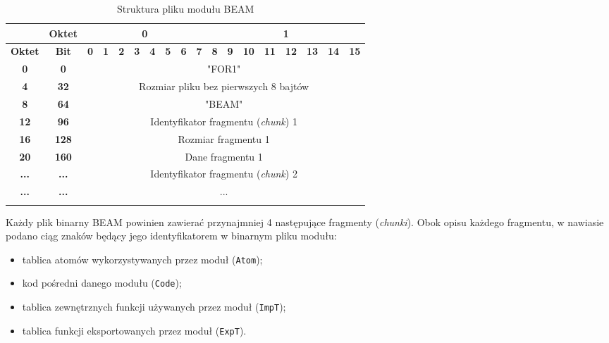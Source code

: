 \begin{longtable}{|c|c|c|c|c|c|c|c|c|c|c|c|c|c|c|c|c|c|}
\hline
         & \textbf{Oktet} & \multicolumn{8}{|c|}{\textbf{0}} & \multicolumn{8}{|c|}{\textbf{1}} \\
\hline
\textbf{Oktet} & \textbf{Bit} & \textbf{0} & \textbf{1} & \textbf{2} & \textbf{3} & \textbf{4} & \textbf{5} & \textbf{6} & \textbf{7} & \textbf{8} & \textbf{9} & \textbf{10} & \textbf{11} & \textbf{12} & \textbf{13} & \textbf{14} & \textbf{15}\\
\hline
\textbf{0} & \textbf{0} & \multicolumn{16}{|c|}{"FOR1"} \\[3ex]
\hline
\textbf{4} & \textbf{32} & \multicolumn{16}{|c|}{Rozmiar pliku bez pierwszych 8 bajtów}\\[3ex]
\hline
\textbf{8} & \textbf{64} & \multicolumn{16}{|c|}{"BEAM"} \\[3ex]
\hline
\textbf{12} & \textbf{96} & \multicolumn{16}{|c|}{Identyfikator fragmentu (\emph{chunk}) 1}\\[3ex]
\hline
\textbf{16} & \textbf{128} & \multicolumn{16}{|c|}{Rozmiar fragmentu 1} \\[3ex]
\hline
\textbf{20} & \textbf{160} & \multicolumn{16}{|c|}{Dane fragmentu 1} \\[10ex]
\hline
\textbf{...} & \textbf{...} & \multicolumn{16}{|c|}{Identyfikator fragmentu (\emph{chunk}) 2}\\[3ex]
\hline
\textbf{...} & \textbf{...} & \multicolumn{16}{|c|}{...} \\[10ex]
\hline
\caption{Struktura pliku modułu BEAM}
\label{table:beamFile} \\
\end{longtable}

Każdy plik binarny BEAM powinien zawierać przynajmniej 4 następujące fragmenty (\emph{chunki}).
Obok opisu każdego fragmentu, w nawiasie podano ciąg znaków będący jego identyfikatorem w binarnym pliku modułu:
\begin{itemize}
\item tablica atomów wykorzystywanych przez moduł (\texttt{Atom});
\item kod pośredni danego modułu (\texttt{Code});
\item tablica zewnętrznych funkcji używanych przez moduł (\texttt{ImpT});
\item tablica funkcji eksportowanych przez moduł (\texttt{ExpT}).
\end{itemize}

